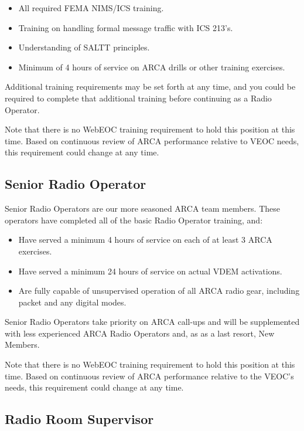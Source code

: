 \documentclass[pdflatex,letterpaper,twoside,12pt]{book}
\begin{document}
\begin{itemize}
	\item All required FEMA NIMS/ICS training.
	\item Training on handling formal message traffic with ICS 213's.
	\item Understanding of SALTT principles.
	\item Minimum of 4 hours of service on ARCA drills or other training exercises.
\end{itemize}

Additional training requirements may be set forth at any time, and you could be required to complete that additional training before continuing as a Radio Operator.

Note that there is no WebEOC training requirement to hold this position at this time.  Based on continuous review of ARCA performance relative to VEOC needs, this requirement could change at any time.

\subsection{Senior Radio Operator}

Senior Radio Operators are our more seasoned ARCA team members.  These operators have completed all of the basic Radio Operator training, and:

\begin{itemize}
	\item Have served a minimum 4 hours of service on each of at least 3 ARCA exercises.
	\item Have served a minimum 24 hours of service on actual VDEM activations.
	\item Are fully capable of unsupervised operation of all ARCA radio gear, including packet and any digital modes.
\end{itemize}

Senior Radio Operators take priority on ARCA call-ups and will be supplemented with less experienced ARCA Radio Operators and, as as a last resort, New Members.

Note that there is no WebEOC training requirement to hold this position at this time.  Based on continuous review of ARCA performance relative to the VEOC's needs, this requirement could change at any time.

\subsection{Radio Room Supervisor}
\end{document}

